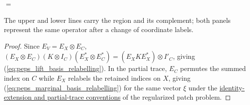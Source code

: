 \begin{lemma}
\begin{tenkzequation}
        $=$
        \begin{tenkz}[rows={wire,wire}, cols=1, bonds=none]
        \end{tenkz}
    \end{tenkzequation}
    The upper and lower lines carry the region and its complement; both panels
    represent the same operator after a change of coordinate labels.
\end{lemma}
\begin{proof}
    \leanok
    Since $E_V=E_X\otimes E_C$,
    $(E_X\otimes E_C)(K\otimes I_C)(E_X^*\otimes E_C^*)=(E_XKE_X^*)\otimes I'_C$,
    giving (\ref{eq:peps_lift_basis_relabelling}). In the partial trace,
    $E_C$ permutes the summed index on $C$ while $E_X$ relabels the retained
    indices on $X$, giving (\ref{eq:peps_marginal_basis_relabelling}) for the same vector $\xi$ under the
    \href{https://github.com/openai/math/blob/adc7f1241b42e322a6451854ab7e4b4c146bf78a/preprints/Polynomial-PEPS-approximation-of-gapped-square-grid-ground-states-September-24-2026/build/sections/03-patches.tex\#L80-L99}{identity-extension and partial-trace conventions}
    of the regularized patch problem.
\end{proof}

